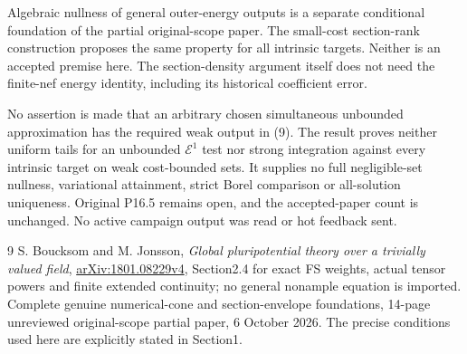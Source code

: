\documentclass[11pt]{article}
\begin{document}
Algebraic nullness of general outer-energy outputs is a separate
conditional foundation of the partial original-scope paper. The
small-cost section-rank construction proposes the same property for
all intrinsic targets. Neither is an accepted premise here. The
section-density argument itself does not need the finite-nef energy
identity, including its historical coefficient error.

No assertion is made that an arbitrary chosen simultaneous unbounded
approximation has the required weak output in (9). The result proves
neither uniform tails for an unbounded $\mathcal E^1$ test nor strong
integration against every intrinsic target on weak cost-bounded sets.
It supplies no full negligible-set nullness, variational attainment,
strict Borel comparison or all-solution uniqueness. Original P16.5
remains open, and the accepted-paper count is unchanged.
No active campaign output was read or hot feedback sent.

\begin{thebibliography}{9}\small
{} S. Boucksom and M. Jonsson,
\emph{Global pluripotential theory over a trivially valued field},
\href{https://arxiv.org/pdf/1801.08229v4}{arXiv:1801.08229v4},
Section2.4 for exact FS weights, actual tensor powers and finite
extended continuity; no general nonample equation is imported.
 Complete genuine numerical-cone and
section-envelope foundations, 14-page unreviewed original-scope
partial paper, 6 October 2026. The precise conditions used here
are explicitly stated in Section1.
\end{thebibliography}
\end{document}
